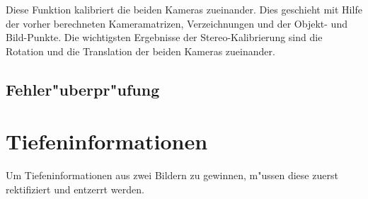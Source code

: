 \newpage

Diese Funktion kalibriert die beiden Kameras zueinander. Dies geschieht mit Hilfe der vorher berechneten Kameramatrizen, Verzeichnungen und der Objekt- und Bild-Punkte.\newline 
Die wichtigsten Ergebnisse der Stereo-Kalibrierung sind die Rotation und die Translation der beiden Kameras zueinander.

\subsection{Fehler"uberpr"ufung}
\label{sec:fehlertest}

\section{Tiefeninformationen}
\label{sec:tiefeninformationen}

Um Tiefeninformationen aus zwei Bildern zu gewinnen, m"ussen diese zuerst rektifiziert und entzerrt werden. 
